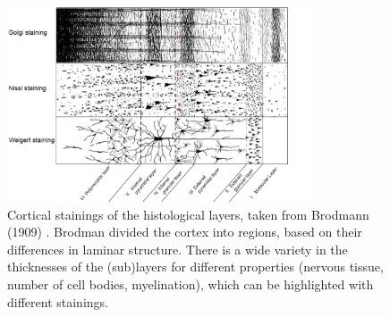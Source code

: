 \begin{figure}[ht]
	\centering
	\includegraphics[width=0.8\textwidth, clip=true]{./Chapters/01_Introduction/Images/Layers}
	\caption{Cortical stainings of the histological layers, taken from Brodmann (1909) \cite{Brodmann1909}. Brodman divided the cortex into regions, based on their differences in laminar structure. There is a wide variety in the thicknesses of the (sub)layers for different properties (nervous tissue, number of cell bodies, myelination), which can be highlighted with different stainings.}
	\label{fig:layers}
\end{figure}